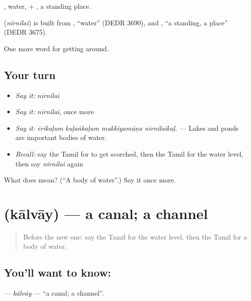 , water, + , a standing place.

\begin{cousinweb}
\textbf{} (\emph{nīrnilai}) is built from , \textquotedblleft{}water\textquotedblright{} (DEDR 3690), and , \textquotedblleft{}a standing, a place\textquotedblright{} (DEDR 3675).
\end{cousinweb}

\begin{grammarlens}[title={What you've built}]
One more word for getting around.
\end{grammarlens}

\subsection*{Your turn}
\begin{itemize}
\raggedright
  \item \emph{Say it:} \emph{nīrnilai}
  \item \emph{Say it:} \emph{nīrnilai}, once more
  \item \emph{Say it:} \emph{ērikaḷum kuḷaṅkaḷum mukkiyamāṉa nīrnilaikaḷ.} — Lakes and ponds are important bodies of water.
  \item \emph{Recall:} say the Tamil for to get scorched, then the Tamil for the water level, then say \emph{nīrnilai} again
\end{itemize}

\begin{tcolorbox}[breakable,colback=teal!4,colframe=teal!35!black,title={Before you move on}]
What does  mean? (\textquotedblleft{}A body of water\textquotedblright{}.) Say it once more.
\end{tcolorbox}
\section[\texorpdfstring{\ta{கால்வாய்} (kālvāy)}{கால்வாய் (kālvāy)}]{ (kālvāy) — a canal; a channel}

\label{lesson:TA-C432-kalvay}



\begin{quote}
Before the new one: say the Tamil for the water level, then the Tamil for a body of water.
\end{quote}

\subsection*{You'll want to know: }
\textbf{} — \emph{kālvāy} — \textquotedblleft{}a canal; a channel\textquotedblright{}.

